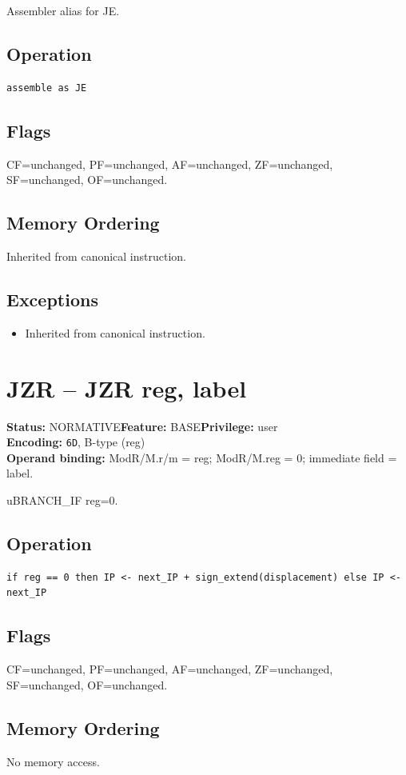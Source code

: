 \documentclass[10pt]{article}
\begin{document}
Assembler alias for JE.

\subsection*{Operation}
\begin{lstlisting}
assemble as JE
\end{lstlisting}
\subsection*{Flags}
CF=unchanged, PF=unchanged, AF=unchanged, ZF=unchanged, SF=unchanged, OF=unchanged.
\subsection*{Memory Ordering}
Inherited from canonical instruction.
\subsection*{Exceptions}
\begin{itemize}
\item Inherited from canonical instruction.
\end{itemize}
\clearpage

\section{JZR -- JZR reg, label}
\textbf{Status:} NORMATIVE\quad \textbf{Feature:} BASE\quad \textbf{Privilege:} user\\
\textbf{Encoding:} \texttt{6D}, B-type (reg)\\
\textbf{Operand binding:} ModR/M.r/m = reg; ModR/M.reg = 0; immediate field = label.

uBRANCH\_IF reg=0.

\subsection*{Operation}
\begin{lstlisting}
if reg == 0 then IP <- next_IP + sign_extend(displacement) else IP <- next_IP
\end{lstlisting}
\subsection*{Flags}
CF=unchanged, PF=unchanged, AF=unchanged, ZF=unchanged, SF=unchanged, OF=unchanged.
\subsection*{Memory Ordering}
No memory access.
\end{document}
